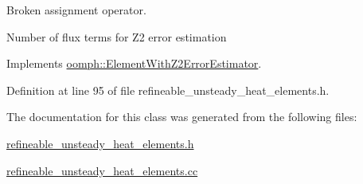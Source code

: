 Broken assignment operator. 

Number of \textquotesingle{}flux\textquotesingle{} terms for Z2 error estimation 

Implements \hyperlink{classoomph_1_1ElementWithZ2ErrorEstimator_ae82c5728902e13da31be19c390fc28e3}{oomph\+::\+Element\+With\+Z2\+Error\+Estimator}.



Definition at line 95 of file refineable\+\_\+unsteady\+\_\+heat\+\_\+elements.\+h.



The documentation for this class was generated from the following files\+:\begin{DoxyCompactItemize}
\item 
\hyperlink{refineable__unsteady__heat__elements_8h}{refineable\+\_\+unsteady\+\_\+heat\+\_\+elements.\+h}\item 
\hyperlink{refineable__unsteady__heat__elements_8cc}{refineable\+\_\+unsteady\+\_\+heat\+\_\+elements.\+cc}\end{DoxyCompactItemize}
